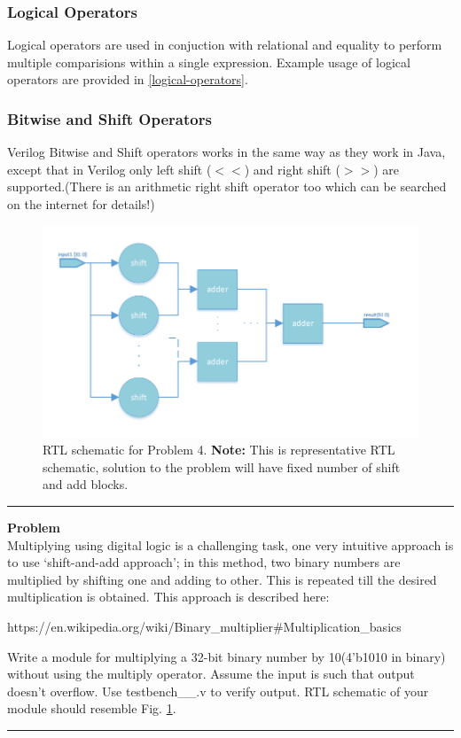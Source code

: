 \documentclass[a4paper,10pt]{article}
\newcommand{\ano}{\text{1}}
\theoremstyle{mytheor}
\newcommand{
  \insertverilog}[3]{
  
}
\newcounter{problemNumber}
\newcommand {
  \insertProblem}[1]{
  \vspace{0.5cm}
  \hrule
  \vspace{0.3cm}

  {\color{greatblue}\textbf{\large{Problem \theproblemNumber}}}
  \vspace{2pt}\\#1

  \addtocounter{problemNumber}{1}
  \vspace{0.2cm}
  \hrule  
  \vspace{0.5cm}
}
\begin{document}
\subsubsection*{Logical Operators}
Logical operators are used in conjuction with relational and equality
to perform multiple comparisions within a single expression.
Example usage of logical operators are provided in \ref{logical-operators}.
\insertverilog{./verilog_files/logicalOperators.v}{logical-operators}{\text{Functioning of logical operator}}

\subsubsection*{Bitwise and Shift Operators}
Verilog Bitwise and Shift operators works in the same way as they work
in Java, except that in Verilog only left shift (\textbf{$<<$}) and right shift
(\textbf{$>>$}) are supported.(There is an arithmetic right shift operator too which can be searched on the internet for details!)

\begin{figure}[!h] \centering  
  \includegraphics[width=0.9\linewidth]{./resources/shift_and_add_representation.pdf}
  \caption{RTL schematic for Problem 4. \textbf{Note:} This is representative RTL schematic, solution to the problem will have fixed number of shift and add blocks.} 
  \label{Fig:problem-4-RTL} 
\end{figure}    

\insertProblem {
  Multiplying using digital logic is a challenging task, one very intuitive approach is to use `shift-and-add approach'; in this method, two binary numbers are multiplied by shifting one and adding to other. This is repeated till the desired multiplication is obtained. This approach is described here: \begin{center}https://en.wikipedia.org/wiki/Binary\_multiplier\#Multiplication\_basics\end{center} 
  
    Write a module for multiplying a 32-bit binary number by 10(4'b1010 in binary) without using the multiply operator. Assume the input is such that output doesn't overflow. Use {testbench\_{\ano}\_{\theproblemNumber}.v} to verify output. RTL schematic of your module should resemble Fig. \ref{Fig:problem-4-RTL}.
}
\end{document}
